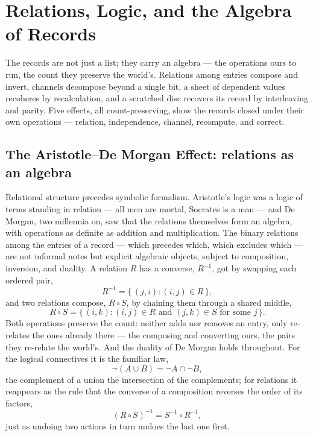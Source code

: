 \chapter{Relations, Logic, and the Algebra of Records}
\label{chap:relations-logic-algebra}

The records are not just a list; they carry an algebra --- the operations ours to run, the count they preserve
the world's. Relations among entries compose and invert, channels
decompose beyond a single bit, a sheet of dependent values recoheres by recalculation, and a scratched disc
recovers its record by interleaving and parity. Five effects, all count-preserving, show the records closed
under their own operations --- relation, independence, channel, recompute, and correct.

\section{The Aristotle--De Morgan Effect: relations as an algebra}
\label{se:aristotle-demorgan}

Relational structure precedes symbolic formalism. Aristotle's logic was a logic of terms standing in relation
--- all men are mortal, Socrates is a man --- and De Morgan, two millennia on, saw that the relations
themselves form an algebra, with operations as definite as addition and multiplication. The binary relations
among the entries of a record --- which precedes which, which excludes which --- are not informal notes but
explicit algebraic objects, subject to composition, inversion, and duality. A relation $R$ has a converse,
$R^{-1}$, got by swapping each ordered pair,
\begin{equation}
  R^{-1} = \{\, (j, i) : (i, j) \in R \,\},
\end{equation}
and two relations compose, $R \circ S$, by chaining them through a shared middle,
\begin{equation}
  R \circ S = \{\, (i, k) : (i, j) \in R \text{ and } (j, k) \in S \text{ for some } j \,\}.
\end{equation}
Both operations preserve the count: neither adds nor removes an entry, only re-relates the ones already there
--- the composing and converting ours, the pairs they re-relate the world's.
And the duality of De Morgan holds throughout. For the logical connectives it is the familiar law,
\begin{equation}
  \neg(A \cup B) = \neg A \cap \neg B,
\end{equation}
the complement of a union the intersection of the complements; for relations it reappears as the rule that the
converse of a composition reverses the order of its factors,
\begin{equation}
  (R \circ S)^{-1} = S^{-1} \circ R^{-1},
\end{equation}
just as undoing two actions in turn undoes the last one first.

